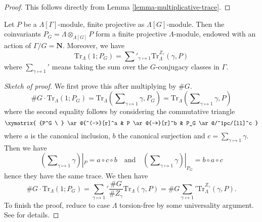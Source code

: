 \begin{proof}
This follows directly from Lemma \ref{lemma-multiplicative-trace}.
\end{proof}

\begin{lemma}
\label{lemma-trivial-trace}
Let $P$ be a $\Lambda[\Gamma]$-module, finite projective as
$\Lambda[G]$-module. Then the coinvariants
$P_G = \Lambda \otimes_{\Lambda[G]} P$
form a finite projective $\Lambda$-module, endowed with an action of
$\Gamma/G = \mathbf{N}$. Moreover, we have
$$
\text{Tr}_\Lambda(1; P_G) =
\sum\nolimits'_{\gamma \mapsto 1} \text{Tr}_\Lambda^{Z_\gamma}(\gamma, P)
$$
where $\sum_{\gamma\mapsto 1}'$ means taking the sum over the $G$-conjugacy
classes in $\Gamma$.
\end{lemma}

\begin{proof}[Sketch of proof]
We first prove this after multiplying by $\# G$.
$$
\# G\cdot \text{Tr}_\Lambda(1; P_G)
= \text{Tr}_\Lambda(\sum\nolimits_{\gamma\mapsto 1} \gamma, P_G)
= \text{Tr}_\Lambda(\sum\nolimits_{\gamma\mapsto 1} \gamma, P)
$$
where the second equality follows by considering the commutative triangle
$$
\xymatrix{
{P^G \ } \ar@{^(->}[r]^a & P \ar@{->>}[r]^b & P_G \ar@/^1pc/[ll]^c
}
$$
where $a$ is the canonical inclusion, $b$ the canonical surjection and $c =
\sum_{\gamma \mapsto 1} \gamma$. Then we have
$$
(\sum\nolimits_{\gamma \mapsto 1} \gamma) |_P = a \circ c \circ b
\quad\text{and}\quad
(\sum\nolimits_{\gamma \mapsto 1} \gamma) |_{P_G} = b \circ a \circ c
$$
hence they have the same trace. We then have
$$
\# G\cdot \text{Tr}_\Lambda(1; P_G)
=
{\sum_{\gamma\mapsto 1}}'
\frac{\# G}{\# Z_\gamma}\text{Tr}_\Lambda(\gamma, P)
= \# G{\sum_{\gamma\mapsto 1}}' \text{Tr}_\Lambda^{Z_\gamma}(\gamma, P).
$$
To finish the proof, reduce to case $\Lambda$ torsion-free by some universality
argument. See \cite{SGA4.5} for details.
\end{proof}

